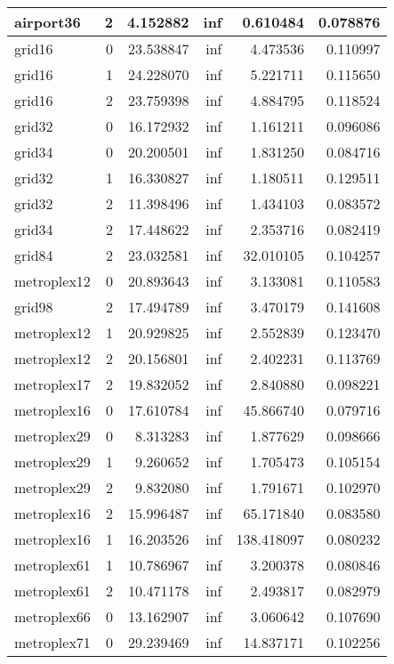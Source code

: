 \begin{longtable}{|l|r|r|r|r|r|}
\endfoot
\hline
\endlastfoot
airport36 & 2 & 4.152882 & inf & 0.610484 & 0.078876 \\\hline
grid16 & 0 & 23.538847 & inf & 4.473536 & 0.110997 \\\hline
grid16 & 1 & 24.228070 & inf & 5.221711 & 0.115650 \\\hline
grid16 & 2 & 23.759398 & inf & 4.884795 & 0.118524 \\\hline
grid32 & 0 & 16.172932 & inf & 1.161211 & 0.096086 \\\hline
grid34 & 0 & 20.200501 & inf & 1.831250 & 0.084716 \\\hline
grid32 & 1 & 16.330827 & inf & 1.180511 & 0.129511 \\\hline
grid32 & 2 & 11.398496 & inf & 1.434103 & 0.083572 \\\hline
grid34 & 2 & 17.448622 & inf & 2.353716 & 0.082419 \\\hline
grid84 & 2 & 23.032581 & inf & 32.010105 & 0.104257 \\\hline
metroplex12 & 0 & 20.893643 & inf & 3.133081 & 0.110583 \\\hline
grid98 & 2 & 17.494789 & inf & 3.470179 & 0.141608 \\\hline
metroplex12 & 1 & 20.929825 & inf & 2.552839 & 0.123470 \\\hline
metroplex12 & 2 & 20.156801 & inf & 2.402231 & 0.113769 \\\hline
metroplex17 & 2 & 19.832052 & inf & 2.840880 & 0.098221 \\\hline
metroplex16 & 0 & 17.610784 & inf & 45.866740 & 0.079716 \\\hline
metroplex29 & 0 & 8.313283 & inf & 1.877629 & 0.098666 \\\hline
metroplex29 & 1 & 9.260652 & inf & 1.705473 & 0.105154 \\\hline
metroplex29 & 2 & 9.832080 & inf & 1.791671 & 0.102970 \\\hline
metroplex16 & 2 & 15.996487 & inf & 65.171840 & 0.083580 \\\hline
metroplex16 & 1 & 16.203526 & inf & 138.418097 & 0.080232 \\\hline
metroplex61 & 1 & 10.786967 & inf & 3.200378 & 0.080846 \\\hline
metroplex61 & 2 & 10.471178 & inf & 2.493817 & 0.082979 \\\hline
metroplex66 & 0 & 13.162907 & inf & 3.060642 & 0.107690 \\\hline
metroplex71 & 0 & 29.239469 & inf & 14.837171 & 0.102256 \\\hline

\end{longtable}
